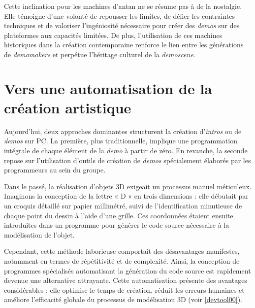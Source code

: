 Cette inclination pour les machines d'antan ne se résume pas à de la nostalgie. Elle témoigne d'une volonté de repousser les limites, de défier les contraintes techniques et de valoriser l'ingéniosité nécessaire pour créer des \textit{demos} sur des plateformes aux capacités limitées. De plus, l'utilisation de ces machines historiques dans la création contemporaine renforce le lien entre les générations de \textit{demomakers} et perpétue l'héritage culturel de la \textit{demoscene}.

\section{Vers une automatisation de la création artistique}

Aujourd'hui, deux approches dominantes structurent la création d'\textit{intros} ou de \textit{demos} sur PC. La première, plus traditionnelle, implique une programmation intégrale de chaque élément de la \textit{demo} à partir de zéro. En revanche, la seconde repose sur l'utilisation d'outils de création de \textit{demos} spécialement élaborés par les programmeurs au sein du groupe.

Dans le passé, la réalisation d'objets 3D exigeait un processus manuel méticuleux. Imaginons la conception de la lettre « D » en trois dimensions : elle débutait par un croquis détaillé sur papier millimétré, suivi de l'identification minutieuse de chaque point du dessin à l'aide d'une grille. Ces coordonnées étaient ensuite introduites dans un programme pour générer le code source nécessaire à la modélisation de l'objet.

Cependant, cette méthode laborieuse comportait des désavantages manifestes, notamment en termes de répétitivité et de complexité. Ainsi, la conception de programmes spécialisés automatisant la génération du code source est rapidement devenue une alternative attrayante. Cette automatisation présente des avantages considérables : elle optimise le temps de création, réduit les erreurs humaines et améliore l'efficacité globale du processus de modélisation 3D (voir \ref{devtool00}).

